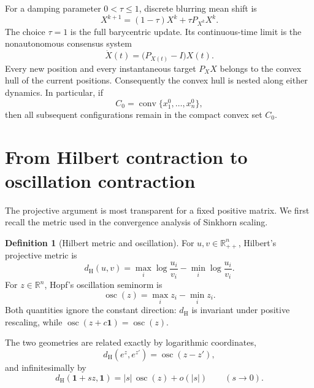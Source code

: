 \documentclass[11pt]{article}
\theoremstyle{definition}
\newtheorem{definition}[theorem]{Definition}
\newcommand{\R}{\mathbb{R}}
\newcommand{\one}{\mathbf{1}}
\newcommand{\conv}{\operatorname{conv}}
\newcommand{\osc}{\operatorname{osc}}
\newcommand{\dH}{d_{\mathrm H}}
\begin{document}
For a damping parameter $0<\tau\leq1$, discrete blurring mean shift is
\begin{equation}\label{eq:discrete-mean-shift}
  X^{k+1}
  =
  (1-\tau)X^k+\tau P_{X^k}X^k.
\end{equation}
The choice $\tau=1$ is the full barycentric update.  Its continuous-time limit
is the nonautonomous consensus system
\begin{equation}\label{eq:continuous-mean-shift}
  \dot X(t)
  =
  \bigl(P_{X(t)}-I\bigr)X(t).
\end{equation}
Every new position and every instantaneous target $P_X X$ belongs to the
convex hull of the current positions.  Consequently the convex hull is nested
along either dynamics.  In particular, if
\begin{equation*}
  C_0=\conv\{x_1^0,\ldots,x_n^0\},
\end{equation*}
then all subsequent configurations remain in the compact convex set $C_0$.

\section{From Hilbert contraction to oscillation contraction}

The projective argument is most transparent for a fixed positive matrix.  We
first recall the metric used in the convergence analysis of Sinkhorn scaling.

\begin{definition}[Hilbert metric and oscillation]
For $u,v\in\R_{++}^n$, Hilbert's projective metric is
\begin{equation}\label{eq:hilbert}
  \dH(u,v)
  =
  \max_i\log\frac{u_i}{v_i}
  -
  \min_i\log\frac{u_i}{v_i}.
\end{equation}
For $z\in\R^n$, Hopf's oscillation seminorm is
\begin{equation}\label{eq:oscillation}
  \osc(z)=\max_i z_i-\min_i z_i.
\end{equation}
Both quantities ignore the constant direction: $\dH$ is invariant under
positive rescaling, while $\osc(z+c\one)=\osc(z)$.
\end{definition}

The two geometries are related exactly by logarithmic coordinates,
\begin{equation}\label{eq:hilbert-log}
  \dH(e^z,e^{z'})=\osc(z-z'),
\end{equation}
and infinitesimally by
\begin{equation}\label{eq:hilbert-linearization}
  \dH(\one+s z,\one)
  =
  |s|\,\osc(z)+o(|s|)
  \qquad (s\to0).
\end{equation}
\end{document}
